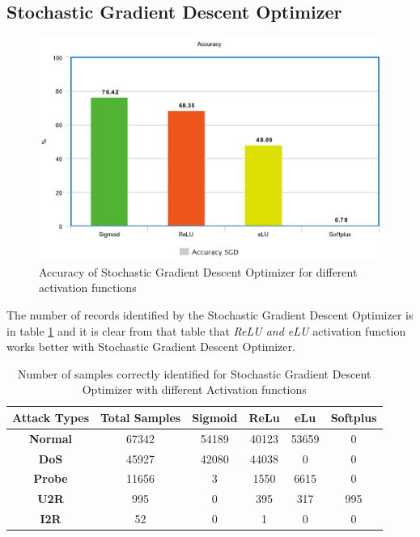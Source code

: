 \documentclass[12pt, a4paper]{report}
\begin{document}
\subsection {Stochastic Gradient Descent Optimizer}
\begin{figure}[ht]
\centering
\captionsetup{justification=centering,margin=2cm}
\includegraphics[width=13cm]{accuracy_SGD_greedy.png}
\caption{ Accuracy of Stochastic Gradient Descent Optimizer for different activation functions}
\label{fig:accuracy_sgd_greedy}
\end{figure}

The number of records identified by the Stochastic Gradient Descent Optimizer is in table \ref{confusion_sgd_greedy} and it is clear from that table that \textit{ReLU and eLU} activation function works better with Stochastic Gradient Descent Optimizer. \\ \par
\clearpage
\begin{table}[ht]
\centering
\captionsetup{justification=centering,margin=2cm}
\begin{tabular}{|c|c|c|c|c|c|}
\hline
\textbf{Attack Types} & \textbf{Total Samples} & \textbf{Sigmoid} & \textbf{ReLu} & \textbf{eLu} & \textbf{Softplus} \\ \hline
\textbf{Normal}       & 67342                  & 54189                     & 40123         & 53659              & 0             \\ \hline
\textbf{DoS}          & 45927                  & 42080          		       & 44038        &0         			& 0             \\ \hline
\textbf{Probe}        & 11656                  & 3           			      & 1550           & 6615        		 & 0              \\ \hline
\textbf{U2R}          & 995                      & 0              				& 395           	 & 317                 & 995               \\ \hline
\textbf{I2R}          & 52                          & 0               		          & 1            	 & 0           		 & 0                \\ \hline
\end{tabular}
\caption{Number of samples correctly identified for Stochastic Gradient Descent Optimizer with different Activation functions}
\label{confusion_sgd_greedy}
\end{table}
\end{document}
